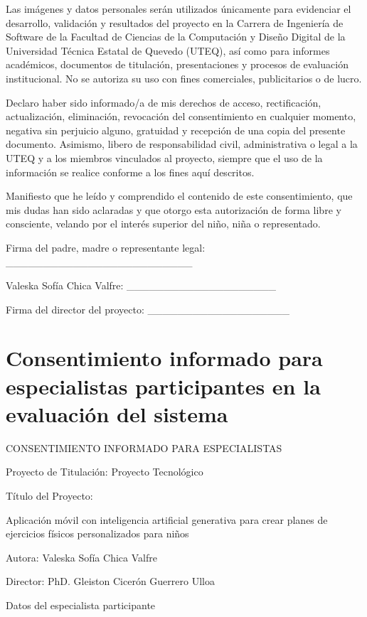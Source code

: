 		Las imágenes y datos personales serán utilizados únicamente para evidenciar el desarrollo, validación y resultados del proyecto en la Carrera de Ingeniería de Software de la Facultad de Ciencias de la Computación y Diseño Digital de la Universidad Técnica Estatal de Quevedo (UTEQ), así como para informes académicos, documentos de titulación, presentaciones y procesos de evaluación institucional. No se autoriza su uso con fines comerciales, publicitarios o de lucro.
		
		Declaro haber sido informado/a de mis derechos de acceso, rectificación, actualización, eliminación, revocación del consentimiento en cualquier momento, negativa sin perjuicio alguno, gratuidad y recepción de una copia del presente documento. Asimismo, libero de responsabilidad civil, administrativa o legal a la UTEQ y a los miembros vinculados al proyecto, siempre que el uso de la información se realice conforme a los fines aquí descritos.
		
		Manifiesto que he leído y comprendido el contenido de este consentimiento, que mis dudas han sido aclaradas y que otorgo esta autorización de forma libre y consciente, velando por el interés superior del niño, niña o representado.
		
		Firma del padre, madre o representante legal: \_\_\_\_\_\_\_\_\_\_\_\_\_\_\_\_\_\_\_\_\_\_\_\_\_
		
		Valeska Sofía Chica Valfre: \_\_\_\_\_\_\_\_\_\_\_\_\_\_\_\_\_\_\_\_
		
		Firma del director del proyecto: \_\_\_\_\_\_\_\_\_\_\_\_\_\_\_\_\_\_\_
		
	\section[Especialistas participantes en la evaluación]{Consentimiento informado para especialistas participantes en la evaluación del sistema}
		CONSENTIMIENTO INFORMADO PARA ESPECIALISTAS
		
		Proyecto de Titulación: Proyecto Tecnológico
		
		Título del Proyecto:
		
		Aplicación móvil con inteligencia artificial generativa para crear planes de ejercicios físicos personalizados para niños
		
		Autora: Valeska Sofía Chica Valfre
		
		Director: PhD. Gleiston Cicerón Guerrero Ulloa
		
		Datos del especialista participante
		
